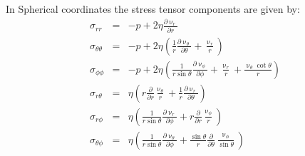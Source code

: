 In Spherical coordinates the stress tensor components are given by:
\begin{eqnarray}
\sigma_{rr} &=& -p + 2 \eta \frac{\partial \upnu_r}{\partial r}      \\
\sigma_{\theta\theta} &=& 
 -p + 2\eta \left( \frac{1}{r} \frac{\partial \upnu_\theta}{\partial\theta} +\frac{\upnu_r}{r} \right)    \\
\sigma_{\phi\phi} &=& 
-p + 2\eta \left( \frac{1}{r \sin \theta} \frac{\partial \upnu_\phi}{\partial \phi} 
+\frac{\upnu_r}{r}  + \frac{\upnu_\theta \cot \theta}{r} \right) \\
\sigma_{r\theta} &=& \eta\left(  r \frac{\partial}{\partial r} \frac{\upnu_\theta}{r}  
+\frac{1}{r} \frac{\partial \upnu_r}{\partial\theta}   \right)\\
\sigma_{r\phi} &=& \eta \left( \frac{1}{r \sin\theta}\frac{\partial \upnu_r}{\partial \phi} 
+ r \frac{\partial}{\partial r} \frac{\upnu_\phi}{r}  \right)\\
\sigma_{\theta \phi} &=& \eta \left(
\frac{1}{r \sin\theta} \frac{\partial \upnu_\theta}{\partial\phi}
+\frac{\sin\theta}{r} \frac{\partial}{\partial \theta} \frac{\upnu_\phi}{\sin\theta}
\right) 
\end{eqnarray}

